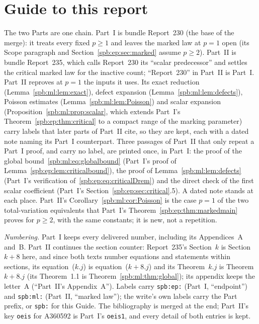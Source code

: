 \documentclass[11pt,letterpaper]{article}
\numberwithin{equation}{section}
\theoremstyle{definition}\newtheorem{definition}[theorem]{Definition}
\theoremstyle{remark}\newtheorem{remark}[theorem]{Remark}
\newcommand{\1}{\mathbf 1}
\newcommand{\file}[1]{\nolinkurl{#1}}
\begin{document}
\section*{Guide to this report}\label{spb:sec:guide}
The two Parts are one chain. Part~I is bundle Report~230 (the base of the
merge): it treats every fixed $p\ge1$ and leaves the marked law at $p=1$ open
(its Scope paragraph and Section~\ref{spb:ep:sec:marked} assume $p\ge2$).
Part~II is bundle Report~235, which calls Report~230 its ``scalar
predecessor'' and settles the critical marked law for the inactive count;
``Report~230'' in Part~II is Part~I. Part~II reproves at $p=1$ the inputs it
uses. Its exact reduction (Lemma~\ref{spb:ml:lem:exact}), defect expansion
(Lemma~\ref{spb:ml:lem:defects}), Poisson estimates
(Lemma~\ref{spb:ml:lem:Poisson}) and scalar expansion
(Proposition~\ref{spb:ml:prop:scalar}, which extends Part~I's
Theorem~\ref{spb:ep:thm:critical} to a compact range of the marking parameter)
carry labels that later parts of Part~II cite, so they are kept, each with a
dated note naming its Part~I counterpart. Three passages of Part~II that only
repeat a Part~I proof, and carry no label, are printed once, in Part~I: the
proof of the global bound~\eqref{spb:ml:eq:globalbound} (Part~I's proof of
Lemma~\ref{spb:ep:lem:criticalbound}), the proof of
Lemma~\ref{spb:ml:lem:defects} (Part~I's verification
of~\eqref{spb:ep:eq:criticalDrem}) and the direct check of the first scalar
coefficient (Part~I's Section~\ref{spb:ep:sec:critical}.5). A dated note
stands at each place. Part~II's Corollary~\ref{spb:ml:cor:Poisson} is the
case $p=1$ of the two total-variation equivalents that Part~I's
Theorem~\ref{spb:ep:thm:markedmain} proves for $p\ge2$, with the same
constants; it is new, not a repetition.

\emph{Numbering.} Part~I keeps every delivered number, including its
Appendices~A and~B. Part~II continues the section counter: Report~235's
Section~$k$ is Section~$k+8$ here, and since both texts number equations and
statements within sections, its equation~($k.j$) is equation~($k+8.j$) and its
Theorem~$k.j$ is Theorem~$k+8.j$ (its Theorem~1.1 is
Theorem~\ref{spb:ml:thm:global}); its appendix keeps the letter~A (``Part~II's
Appendix~A''). Labels carry \file{spb:ep:} (Part~I, ``endpoint'') and
\file{spb:ml:} (Part~II, ``marked law''); the write's own labels carry the Part
prefix, or \file{spb:} for this Guide. The bibliography is merged at the end;
Part~II's key \texttt{oeis} for A360592 is Part~I's \texttt{oeis1}, and every
detail of both entries is kept.
\end{document}
